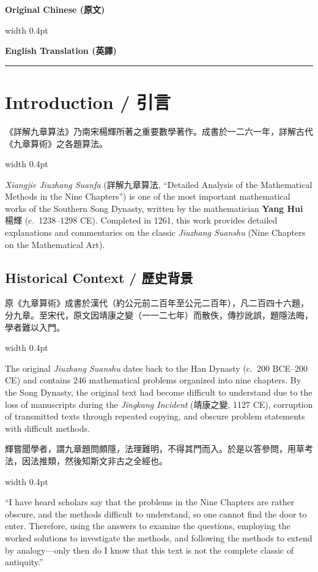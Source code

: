 \documentclass[10pt,a4paper]{article}
\newcommand{\zh}[1]{{\CJKfamily{notocjksc}#1}}
\newcommand{\bilingual}[2]{%
  \par\smallskip\noindent%
  \begin{minipage}[t]{0.47\textwidth}%
    \RaggedRight\small #1%
  \end{minipage}%
  \hfill\vrule width 0.4pt\hfill%
  \begin{minipage}[t]{0.47\textwidth}%
    \RaggedRight\small #2%
  \end{minipage}%
  \par\smallskip%
}
\newcommand{\colheaders}{%
  \noindent
  \begin{minipage}[t]{0.47\textwidth}%
    \centering\textbf{\small\color{sectioncolor}Original Chinese (原文)}%
  \end{minipage}%
  \hfill\vrule width 0.4pt\hfill
  \begin{minipage}[t]{0.47\textwidth}%
    \centering\textbf{\small\color{sectioncolor}English Translation (英譯)}%
  \end{minipage}%
  \par\vspace{0.5em}%
  \noindent\rule{\textwidth}{0.6pt}\par\vspace{0.5em}%
}
\begin{document}
\newpage
\tableofcontents
\newpage

\colheaders

\section{Introduction / 引言}

\bilingual{
  \zh{《詳解九章算法》}乃南宋楊輝所著之重要數學著作。成書於一二六一年，詳解古代《九章算術》之各題算法。
}{
  \textit{Xiangjie Jiuzhang Suanfa} (\zh{詳解九章算法}, ``Detailed Analysis of the Mathematical Methods in the Nine Chapters'') is one of the most important mathematical works of the Southern Song Dynasty, written by the mathematician \textbf{Yang Hui} \zh{楊輝} (c.~1238--1298 CE). Completed in 1261, this work provides detailed explanations and commentaries on the classic \textit{Jiuzhang Suanshu} (Nine Chapters on the Mathematical Art).
}

\subsection{Historical Context / 歷史背景}

\bilingual{
  原《九章算術》成書於漢代（約公元前二百年至公元二百年），凡二百四十六題，分九章。至宋代，原文因\zh{靖康之變}（一一二七年）而散佚，傳抄訛誤，題隱法晦，學者難以入門。
}{
  The original \textit{Jiuzhang Suanshu} dates back to the Han Dynasty (c.~200 BCE--200 CE) and contains 246 mathematical problems organized into nine chapters. By the Song Dynasty, the original text had become difficult to understand due to the loss of manuscripts during the \textit{Jingkang Incident} (\zh{靖康之變}, 1127 CE), corruption of transmitted texts through repeated copying, and obscure problem statements with difficult methods.
}

\bilingual{
  \zh{輝嘗聞學者，謂九章題問頗隱，法理難明，不得其門而入。於是以答參問，用草考法，因法推類，然後知斯文非古之全經也。}
}{%
  ``I have heard scholars say that the problems in the Nine Chapters are rather obscure, and the methods difficult to understand, so one cannot find the door to enter. Therefore, using the answers to examine the questions, employing the worked solutions to investigate the methods, and following the methods to extend by analogy---only then do I know that this text is not the complete classic of antiquity.''
}
\end{document}
